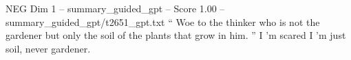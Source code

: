 \begin{textsample}{NEG Dim 1 – summary\_guided\_gpt – Score 1.00 – summary\_guided\_gpt/t2651\_gpt.txt}  \label{ex:f1_neg_025}
“ Woe to the thinker who is not the gardener but only the soil of the plants that grow in him. ” I ’m scared I ’m just soil, never gardener.

\end{textsample}
